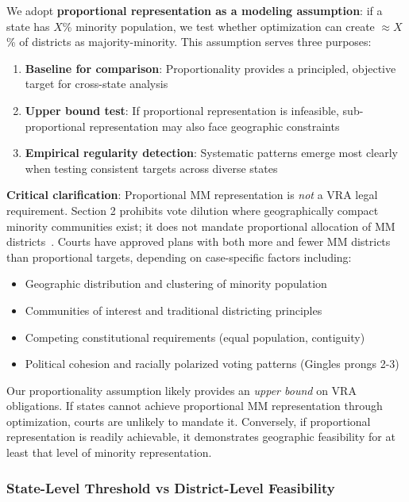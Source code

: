 We adopt \textbf{proportional representation as a modeling assumption}: if a state has $X$\% minority population, we test whether optimization can create $\approx X$\% of districts as majority-minority. This assumption serves three purposes:

\begin{enumerate}
    \item \textbf{Baseline for comparison}: Proportionality provides a principled, objective target for cross-state analysis
    \item \textbf{Upper bound test}: If proportional representation is infeasible, sub-proportional representation may also face geographic constraints
    \item \textbf{Empirical regularity detection}: Systematic patterns emerge most clearly when testing consistent targets across diverse states
\end{enumerate}

\textbf{Critical clarification}: Proportional MM representation is \emph{not} a VRA legal requirement. Section 2 prohibits vote dilution where geographically compact minority communities exist; it does not mandate proportional allocation of MM districts~\citep{johnson1996}. Courts have approved plans with both more and fewer MM districts than proportional targets, depending on case-specific factors including:

\begin{itemize}
    \item Geographic distribution and clustering of minority population
    \item Communities of interest and traditional districting principles
    \item Competing constitutional requirements (equal population, contiguity)
    \item Political cohesion and racially polarized voting patterns (Gingles prongs 2-3)
\end{itemize}

Our proportionality assumption likely provides an \emph{upper bound} on VRA obligations. If states cannot achieve proportional MM representation through optimization, courts are unlikely to mandate it. Conversely, if proportional representation is readily achievable, it demonstrates geographic feasibility for at least that level of minority representation.

\subsubsection{State-Level Threshold vs District-Level Feasibility}

